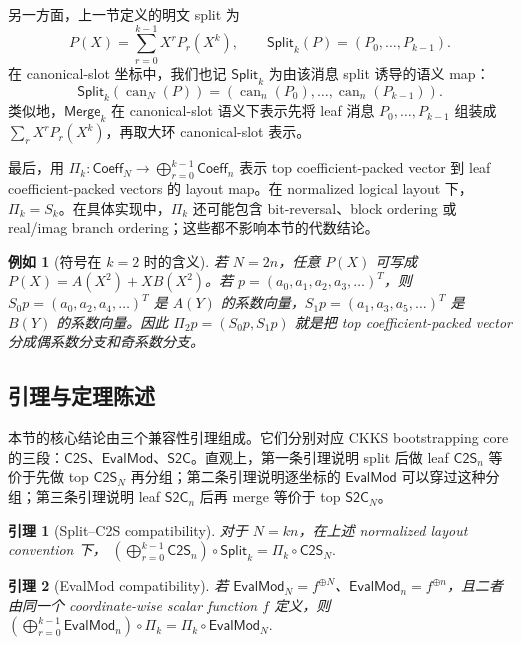 \documentclass[UTF8,11pt]{article}
\newcommand{\Split}{\mathsf{Split}}
\newcommand{\Merge}{\mathsf{Merge}}
\newcommand{\CtwoS}{\mathsf{C2S}}
\newcommand{\StwoC}{\mathsf{S2C}}
\newcommand{\EvalMod}{\mathsf{EvalMod}}
\theoremstyle{definition}
\theoremstyle{plain}
\newtheorem{lemma}{引理}
\newtheorem{example}{例如}
\begin{document}
另一方面，上一节定义的明文 split 为
\[
P(X)=\sum_{r=0}^{k-1}X^rP_r(X^k),
\qquad
\Split_k(P)=(P_0,\ldots,P_{k-1}).
\]
在 canonical-slot 坐标中，我们也记 \(\Split_k\) 为由该消息 split 诱导的语义 map：
\[
\Split_k(\operatorname{can}_N(P))
=
(\operatorname{can}_n(P_0),\ldots,\operatorname{can}_n(P_{k-1})).
\]
类似地，\(\Merge_k\) 在 canonical-slot 语义下表示先将 leaf 消息 \(P_0,\ldots,P_{k-1}\) 组装成 \(\sum_rX^rP_r(X^k)\)，再取大环 canonical-slot 表示。

最后，用 \(\Pi_k:\mathsf{Coeff}_N\to\bigoplus_{r=0}^{k-1}\mathsf{Coeff}_n\) 表示 top coefficient-packed vector 到 leaf coefficient-packed vectors 的 layout map。在 normalized logical layout 下，\(\Pi_k=S_k\)。在具体实现中，\(\Pi_k\) 还可能包含 bit-reversal、block ordering 或 real/imag branch ordering；这些都不影响本节的代数结论。

\begin{example}[符号在 \(k=2\) 时的含义]
若 \(N=2n\)，任意 \(P(X)\) 可写成 \(P(X)=A(X^2)+XB(X^2)\)。若 \(p=(a_0,a_1,a_2,a_3,\ldots)^T\)，则 \(S_0p=(a_0,a_2,a_4,\ldots)^T\) 是 \(A(Y)\) 的系数向量，\(S_1p=(a_1,a_3,a_5,\ldots)^T\) 是 \(B(Y)\) 的系数向量。因此 \(\Pi_2p=(S_0p,S_1p)\) 就是把 top coefficient-packed vector 分成偶系数分支和奇系数分支。
\end{example}

\subsection{引理与定理陈述}
\label{subsec:lemmas-theorems-statement}

本节的核心结论由三个兼容性引理组成。它们分别对应 CKKS bootstrapping core 的三段：\(\CtwoS\)、\(\EvalMod\)、\(\StwoC\)。直观上，第一条引理说明 split 后做 leaf \(\CtwoS_n\) 等价于先做 top \(\CtwoS_N\) 再分组；第二条引理说明逐坐标的 \(\EvalMod\) 可以穿过这种分组；第三条引理说明 leaf \(\StwoC_n\) 后再 merge 等价于 top \(\StwoC_N\)。

\begin{lemma}[Split--C2S compatibility]
\label{lem:split-c2s}
对于 \(N=kn\)，在上述 normalized layout convention 下，
\(\left(\bigoplus_{r=0}^{k-1}\CtwoS_n\right)\circ\Split_k=\Pi_k\circ\CtwoS_N.\)
\end{lemma}

\begin{lemma}[EvalMod compatibility]
\label{lem:evalmod}
若 \(\EvalMod_N=f^{\oplus N}\)、\(\EvalMod_n=f^{\oplus n}\)，且二者由同一个 coordinate-wise scalar function \(f\) 定义，则
\(\left(\bigoplus_{r=0}^{k-1}\EvalMod_n\right)\circ\Pi_k=\Pi_k\circ\EvalMod_N.\)
\end{lemma}
\end{document}

